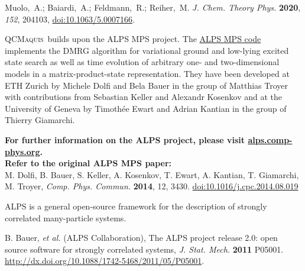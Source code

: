\documentclass[bibliography=totoc,12pt,a4paper]{scrartcl}
\newcommand{\qcm}{\textsc{QCMaquis}}
\begin{document}
\begin{framed}
  \noindent Muolo,~A.; Baiardi,~A.; Feldmann,~R.; Reiher,~M. \emph{J. Chem. Theory Phys.}
	\textbf{2020}, \emph{152}, 204103, \href{https://doi.org/10.1063/5.0007166}{doi:10.1063/5.0007166}.
\end{framed}


\qcm\ builds upon the ALPS MPS project. 
The \href{http://alps.comp-phys.org/static/mps\_doc/index.html}{ALPS MPS code} implements the DMRG algorithm for variational ground and low-lying excited state search as well as time evolution of arbitrary one- and two-dimensional models in a matrix-product-state representation.
They have been developed at ETH Zurich by Michele Dolfi and Bela Bauer in the group of Matthias Troyer with contributions from Sebastian Keller and Alexandr Kosenkov and at the University of Geneva by Timoth{\'e}e Ewart and Adrian Kantian in the group of Thierry Giamarchi.

\begin{framed}
\noindent \textbf{For further information on the ALPS project, please visit \href{alps.comp-phys.org}{alps.comp-phys.org}.}\\[2ex]
\textbf{Refer to the original ALPS MPS paper:}\\
M. Dolfi, B. Bauer, S. Keller, A. Kosenkov, T. Ewart, A. Kantian, T. Giamarchi, M. Troyer, \textit{Comp. Phys. Commun.} \textbf{2014}, 12, 3430. \href{https://doi.org/10.1016/j.cpc.2014.08.019}{doi:10.1016/j.cpc.2014.08.019}
\end{framed}

ALPS is a general open-source framework for the description of strongly correlated many-particle systems.

\begin{framed}
B. Bauer, \textit{et al.} (ALPS Collaboration), The ALPS project release 2.0: open source software for strongly correlated systems, \textit{J. Stat. Mech.} \textbf{2011} P05001. \href{http://dx.doi.org/10.1088/1742-5468/2011/05/P05001}{http://dx.doi.org/10.1088/1742-5468/2011/05/P05001}.
\end{framed}
\end{document}
